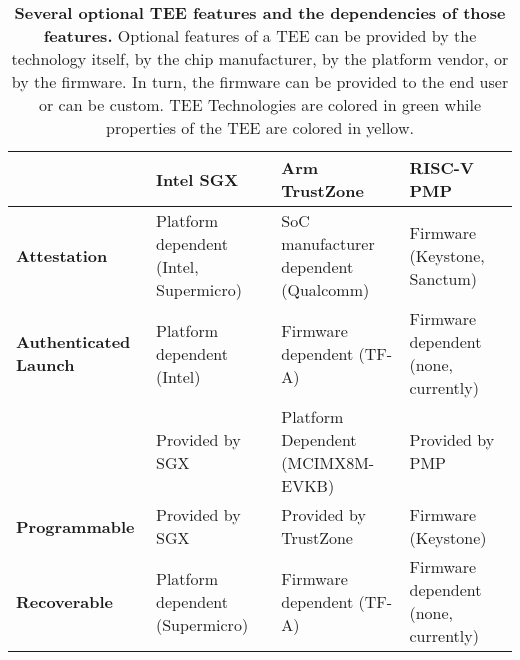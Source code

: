\begin{table*}[p]
\begin{tabular}{|L{3.1cm}|L{3.25cm}|L{3.25cm}|L{3.25cm}|}
\hline
\textbf{} & \textbf{Intel SGX} & \textbf{Arm TrustZone} & \textbf{RISC-V PMP}   \\ \hline
{}\textbf{Attestation}  & Platform dependent (Intel, Supermicro)  & SoC manufacturer dependent (Qualcomm)   & Firmware (Keystone, Sanctum)     \\ \hline
{}\textbf{Authenticated Launch} & Platform dependent (Intel)  & Firmware dependent (TF-A)      & Firmware dependent (none, currently)  \\ \hline
{}\textbf{} & Provided by SGX      & Platform Dependent  (MCIMX8M-EVKB)     & Provided by PMP \\ \hline
{}\textbf{Programmable} & Provided by SGX      & Provided by TrustZone    & Firmware (Keystone)      \\ \hline
{}\textbf{Recoverable}  & Platform dependent (Supermicro)      & Firmware dependent  (TF-A)    & Firmware dependent (none, currently) \\ \hline
\end{tabular}
\caption[TEE Features and their dependencies]{\textbf{Several optional TEE features and the dependencies of those features.} Optional features of a TEE can be provided by the technology itself, by the chip manufacturer, by the platform vendor, or by the firmware. In turn, the firmware can be provided to the end user or can be custom. TEE Technologies are colored in \colorbox{tbl-gre}{green} while properties of the TEE are colored in \colorbox{tbl-yel}{yellow}.}
\label{tab:tee-compare}
\end{table*}

